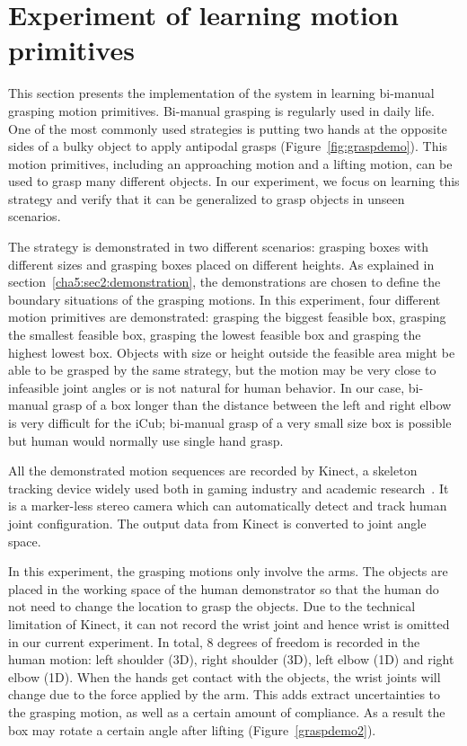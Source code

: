\section{Experiment of learning motion primitives}
\label{cha5:sec3:experiment}




This section presents the implementation of the system in learning bi-manual grasping motion primitives. Bi-manual grasping is regularly used in daily life. One of the most commonly used strategies is putting two hands at the opposite sides of a bulky object to apply antipodal grasps (Figure~\ref{fig:graspdemo}). This motion primitives, including an approaching motion and a lifting motion, can be used to grasp many different objects. In our experiment, we focus on learning this strategy and verify that it can be generalized to grasp objects in unseen scenarios.

The strategy is demonstrated in two different scenarios: grasping boxes with different sizes and grasping boxes placed on different heights. As explained in section~\ref{cha5:sec2:demonstration}, the demonstrations are chosen to define the boundary situations of the grasping motions. In this experiment, four different motion primitives are demonstrated: grasping the biggest feasible box,  grasping the smallest feasible box, grasping the lowest feasible box and grasping the highest lowest box. Objects with size or height outside the feasible area might be able to be grasped by the same strategy, but the motion may be very close to infeasible joint angles or is not natural for human behavior. In our case, bi-manual grasp of a box longer than the distance between the left and right elbow is very difficult for the iCub; bi-manual grasp of a very small size box is possible but human would normally use single hand grasp.

All the demonstrated motion sequences are recorded by Kinect, a skeleton tracking device widely used both in gaming industry and academic research~\citep{ren20123d}. It is a marker-less stereo camera which can automatically detect and track human joint configuration. The output data from Kinect is converted to joint angle space.

In this experiment, the grasping motions only involve the arms. The objects are placed in the working space of the human demonstrator so that the human do not need to change the location to grasp the objects. Due to the technical limitation of Kinect, it can not record the wrist joint and hence wrist is omitted in our current experiment. In total, 8 degrees of freedom is recorded in the human motion: left shoulder (3D), right shoulder (3D), left elbow (1D) and right elbow (1D). When the hands get contact with the objects, the wrist joints will change due to the force applied by the arm. This adds extract uncertainties to the grasping motion, as well as a certain amount of compliance. As a result the box may rotate a certain angle after lifting (Figure~\ref{graspdemo2}).


